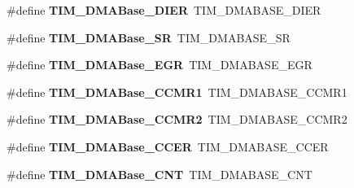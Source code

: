 \begin{DoxyCompactItemize}
\item 
\#define {\bfseries T\+I\+M\+\_\+\+D\+M\+A\+Base\+\_\+\+D\+I\+ER}~T\+I\+M\+\_\+\+D\+M\+A\+B\+A\+S\+E\+\_\+\+D\+I\+ER\hypertarget{group___h_a_l___t_i_m___aliased___defines_gaeddacbbc2adf9705feac250f077d8c93}{}\label{group___h_a_l___t_i_m___aliased___defines_gaeddacbbc2adf9705feac250f077d8c93}

\item 
\#define {\bfseries T\+I\+M\+\_\+\+D\+M\+A\+Base\+\_\+\+SR}~T\+I\+M\+\_\+\+D\+M\+A\+B\+A\+S\+E\+\_\+\+SR\hypertarget{group___h_a_l___t_i_m___aliased___defines_ga5cda07a11a76bbb24a7d5bb680814d31}{}\label{group___h_a_l___t_i_m___aliased___defines_ga5cda07a11a76bbb24a7d5bb680814d31}

\item 
\#define {\bfseries T\+I\+M\+\_\+\+D\+M\+A\+Base\+\_\+\+E\+GR}~T\+I\+M\+\_\+\+D\+M\+A\+B\+A\+S\+E\+\_\+\+E\+GR\hypertarget{group___h_a_l___t_i_m___aliased___defines_gab5e6f6c3fea100896d13ce317a6ccd8e}{}\label{group___h_a_l___t_i_m___aliased___defines_gab5e6f6c3fea100896d13ce317a6ccd8e}

\item 
\#define {\bfseries T\+I\+M\+\_\+\+D\+M\+A\+Base\+\_\+\+C\+C\+M\+R1}~T\+I\+M\+\_\+\+D\+M\+A\+B\+A\+S\+E\+\_\+\+C\+C\+M\+R1\hypertarget{group___h_a_l___t_i_m___aliased___defines_gaab384496cff3e54d8179fc0db727c7ee}{}\label{group___h_a_l___t_i_m___aliased___defines_gaab384496cff3e54d8179fc0db727c7ee}

\item 
\#define {\bfseries T\+I\+M\+\_\+\+D\+M\+A\+Base\+\_\+\+C\+C\+M\+R2}~T\+I\+M\+\_\+\+D\+M\+A\+B\+A\+S\+E\+\_\+\+C\+C\+M\+R2\hypertarget{group___h_a_l___t_i_m___aliased___defines_ga4989f74592ab359f30bd7c4a4a457571}{}\label{group___h_a_l___t_i_m___aliased___defines_ga4989f74592ab359f30bd7c4a4a457571}

\item 
\#define {\bfseries T\+I\+M\+\_\+\+D\+M\+A\+Base\+\_\+\+C\+C\+ER}~T\+I\+M\+\_\+\+D\+M\+A\+B\+A\+S\+E\+\_\+\+C\+C\+ER\hypertarget{group___h_a_l___t_i_m___aliased___defines_ga6935639db5738662520e8d0eb7116dd6}{}\label{group___h_a_l___t_i_m___aliased___defines_ga6935639db5738662520e8d0eb7116dd6}

\item 
\#define {\bfseries T\+I\+M\+\_\+\+D\+M\+A\+Base\+\_\+\+C\+NT}~T\+I\+M\+\_\+\+D\+M\+A\+B\+A\+S\+E\+\_\+\+C\+NT\hypertarget{group___h_a_l___t_i_m___aliased___defines_gacab604257d144cf3a59b360cbc958ec9}{}\label{group___h_a_l___t_i_m___aliased___defines_gacab604257d144cf3a59b360cbc958ec9}


\end{DoxyCompactItemize}
